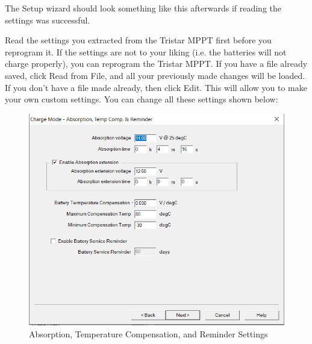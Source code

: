 The Setup wizard should look something like this afterwards if reading the settings was successful.

Read the settings you extracted from the Tristar MPPT first before you reprogram it. If the settings are not to your liking (i.e. the batteries will not charge properly), you can reprogram the Tristar MPPT. If you have a file already saved, click Read from File, and all your previously made changes will be loaded. 
If you don’t have a file made already, then click Edit. This will allow you to make your own custom settings.
You can change all these settings shown below:
  
 
\begin{figure}[!htb]
	\includegraphics[width=\columnwidth,height=\textwidth,scale=0.5]{./graphics/tsmppt_troubleshooting/ms_6.png}
	\caption{\label{fig:settings-1} Absorption, Temperature Compensation, and Reminder Settings}
\end{figure}

